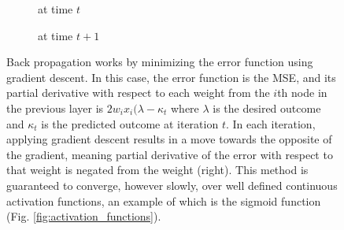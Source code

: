 \begin{figure}[!h]
  \begin{subfigure}{0.45\linewidth}
    \caption{at time $t$}
  \end{subfigure}
  \begin{subfigure}{0.45\linewidth}
    \caption{at time $t+1$}
  \end{subfigure}
  \caption{Back propagation works by minimizing the error function using gradient descent. In this case, the error function is the MSE, and its partial derivative with respect to each weight from the $i$th node in the previous layer is $2w_ix_i(\lambda - \kappa_t$ where $\lambda$ is the desired outcome and $\kappa_t$ is the predicted outcome at iteration $t$. In each iteration, applying gradient descent results in a move towards the opposite of the gradient, meaning partial derivative of the error with respect to that weight is negated from the weight (right). This method is guaranteed to converge, however slowly, over well defined continuous activation functions, an example of which is the sigmoid function (Fig. \ref{fig:activation_functions}).}
  \label{fig:back_propagation}
\end{figure}





